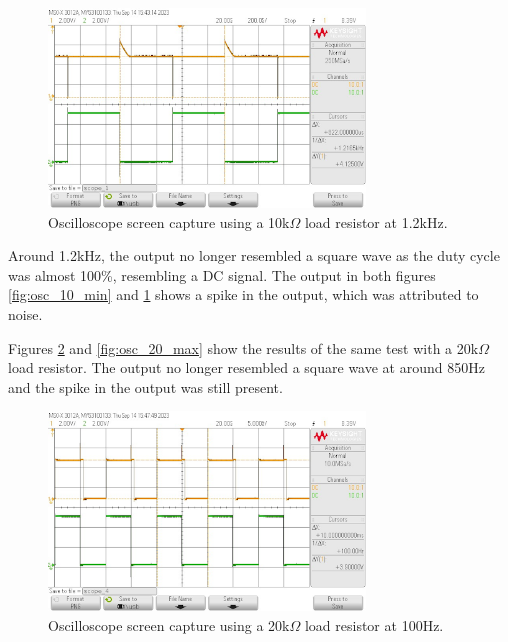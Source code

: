 \documentclass[CMPE]{KGCOEReport}
\begin{document}
\begin{figure}[H]
    \centering
    \includegraphics[width=0.75\textwidth]{output_max_10.png}
    \caption{Oscilloscope screen capture using a 10k$\Omega$ load resistor at 1.2kHz.}
    \label{fig:osc_10_max}
\end{figure}

Around 1.2kHz, the output no longer resembled a square wave as the duty cycle was almost 100\%, resembling a DC signal. The output in both figures \ref{fig:osc_10_min} and \ref{fig:osc_10_max} shows a spike in the output, which was attributed to noise.

Figures \ref{fig:osc_20_min} and \ref{fig:osc_20_max} show the results of the same test with a 20k$\Omega$ load resistor. The output no longer resembled a square wave at around 850Hz and the spike in the output was still present.

\begin{figure}[H]
    \centering
    \includegraphics[width=0.75\textwidth]{output_min_20.png}
    \caption{Oscilloscope screen capture using a 20k$\Omega$ load resistor at 100Hz.}
    \label{fig:osc_20_min}
\end{figure}
\end{document}
